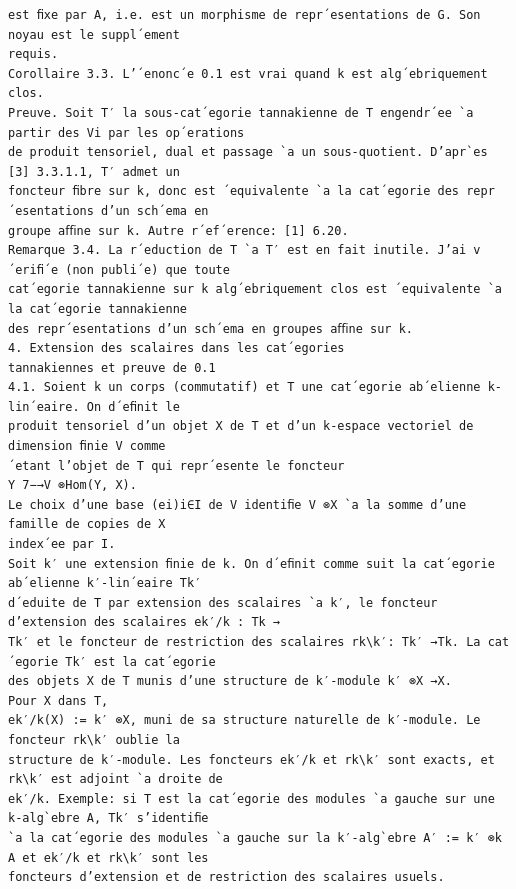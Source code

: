 \documentclass[10pt]{article}
\begin{document}
\begin{verbatim}
est ﬁxe par A, i.e. est un morphisme de repr´esentations de G. Son noyau est le suppl´ement
requis.
Corollaire 3.3. L’´enonc´e 0.1 est vrai quand k est alg´ebriquement clos.
Preuve. Soit T′ la sous-cat´egorie tannakienne de T engendr´ee `a partir des Vi par les op´erations
de produit tensoriel, dual et passage `a un sous-quotient. D’apr`es [3] 3.3.1.1, T′ admet un
foncteur ﬁbre sur k, donc est ´equivalente `a la cat´egorie des repr´esentations d’un sch´ema en
groupe aﬃne sur k. Autre r´ef´erence: [1] 6.20.
Remarque 3.4. La r´eduction de T `a T′ est en fait inutile. J’ai v´eriﬁ´e (non publi´e) que toute
cat´egorie tannakienne sur k alg´ebriquement clos est ´equivalente `a la cat´egorie tannakienne
des repr´esentations d’un sch´ema en groupes aﬃne sur k.
4. Extension des scalaires dans les cat´egories
tannakiennes et preuve de 0.1
4.1. Soient k un corps (commutatif) et T une cat´egorie ab´elienne k-lin´eaire. On d´eﬁnit le
produit tensoriel d’un objet X de T et d’un k-espace vectoriel de dimension ﬁnie V comme
´etant l’objet de T qui repr´esente le foncteur
Y 7−→V ⊗Hom(Y, X).
Le choix d’une base (ei)i∈I de V identiﬁe V ⊗X `a la somme d’une famille de copies de X
index´ee par I.
Soit k′ une extension ﬁnie de k. On d´eﬁnit comme suit la cat´egorie ab´elienne k′-lin´eaire Tk′
d´eduite de T par extension des scalaires `a k′, le foncteur d’extension des scalaires ek′/k : Tk →
Tk′ et le foncteur de restriction des scalaires rk\k′: Tk′ →Tk. La cat´egorie Tk′ est la cat´egorie
des objets X de T munis d’une structure de k′-module k′ ⊗X →X.
Pour X dans T,
ek′/k(X) := k′ ⊗X, muni de sa structure naturelle de k′-module. Le foncteur rk\k′ oublie la
structure de k′-module. Les foncteurs ek′/k et rk\k′ sont exacts, et rk\k′ est adjoint `a droite de
ek′/k. Exemple: si T est la cat´egorie des modules `a gauche sur une k-alg`ebre A, Tk′ s’identiﬁe
`a la cat´egorie des modules `a gauche sur la k′-alg`ebre A′ := k′ ⊗k A et ek′/k et rk\k′ sont les
foncteurs d’extension et de restriction des scalaires usuels.


\end{verbatim}
\end{document}
